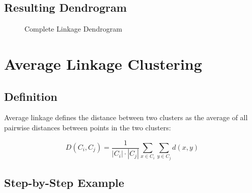 \documentclass{article}
\begin{document}
\subsection{Resulting Dendrogram}

\begin{figure}[h]
    \centering
    \caption{Complete Linkage Dendrogram}
    \label{fig:complete_linkage_dendrogram}
\end{figure}

\section{Average Linkage Clustering}

\subsection{Definition}

Average linkage defines the distance between two clusters as the average of all pairwise distances between points in the two clusters:

\[
D(C_i, C_j) = \frac{1}{|C_i| \cdot |C_j|} \sum_{x \in C_i} \sum_{y \in C_j} d(x, y)
\]

\subsection{Step-by-Step Example}
\end{document}
